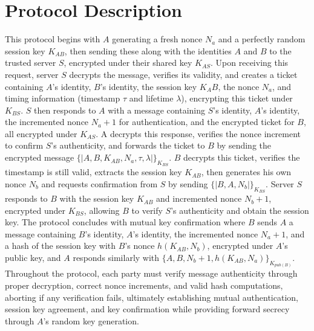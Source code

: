 \section{Protocol Description}

 This protocol begins with $A$ generating a fresh nonce $N_a$ and a perfectly random session key $K_{AB}$, then sending
these along with the identities $A$ and $B$ to the trusted server $S$, encrypted under their shared key $K_{AS}$.
Upon receiving this request, server $S$ decrypts the message, verifies its validity, and creates a ticket
containing $A$'s identity, $B$'s identity, the session key $K_AB$, the nonce $N_a$, and timing information
(timestamp $\tau$ and lifetime $\lambda$), encrypting this ticket under $K_{BS}$. $S$ then responds to $A$ with a message
containing $S$'s identity, $A$'s identity, the incremented nonce $N_a + 1$ for authentication, and the encrypted
ticket for $B$, all encrypted under $K_{AS}$. A decrypts this response, verifies the nonce increment to confirm $S$'s
authenticity, and forwards the ticket to $B$ by sending the encrypted message $\{|A, B, K_{AB}, N_a, \tau, \lambda|\}_{K_{BS}}$.
$B$ decrypts this ticket, verifies the timestamp is still valid, extracts the session key $K_{AB}$, then generates
his own nonce $N_b$ and requests confirmation from $S$ by sending $\{|B, A, N_b|\}_{K_{BS}}$. Server $S$ responds to $B$ with
the session key $K_{AB}$ and incremented nonce $N_b + 1$, encrypted under $K_{BS}$, allowing $B$ to verify $S$'s authenticity
and obtain the session key. The protocol concludes with mutual key confirmation where $B$ sends $A$ a message
containing $B$'s identity, $A$'s identity, the incremented nonce $N_a + 1$, and a hash of the session key with $B$'s
nonce $h(K_{AB}, N_b)$, encrypted under $A$'s public key, and $A$ responds similarly with
$\{A, B, N_b + 1, h(K_{AB}, N_a)\}_{K_{pub(B)}}$. Throughout the protocol, each party must
verify message authenticity through proper decryption, correct nonce increments,
and valid hash computations, aborting if any verification fails, ultimately establishing
mutual authentication, session key agreement, and key confirmation while providing forward
secrecy through $A$'s random key generation.